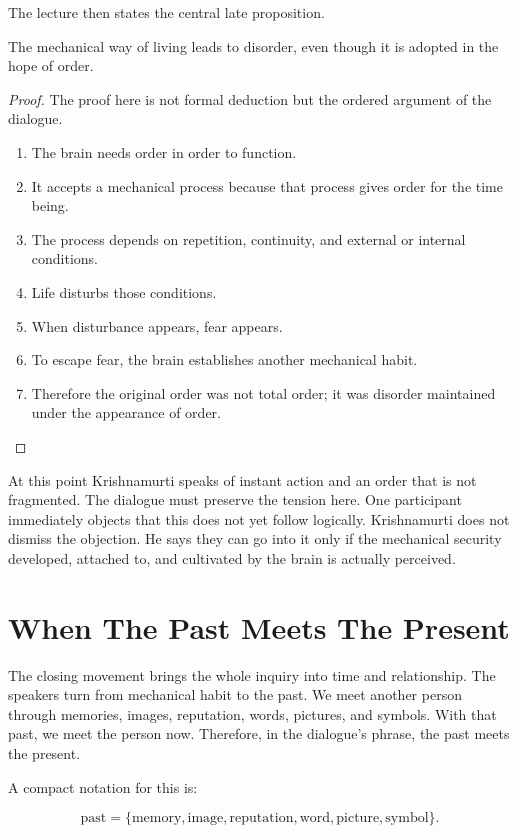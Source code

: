 The lecture then states the central late proposition.

\begin{proposition}
The mechanical way of living leads to disorder, even though it is adopted in the hope of order.
\end{proposition}

\begin{proof}
The proof here is not formal deduction but the ordered argument of the dialogue.
\begin{enumerate}
\item The brain needs order in order to function.
\item It accepts a mechanical process because that process gives order for the time being.
\item The process depends on repetition, continuity, and external or internal conditions.
\item Life disturbs those conditions.
\item When disturbance appears, fear appears.
\item To escape fear, the brain establishes another mechanical habit.
\item Therefore the original order was not total order; it was disorder maintained under the appearance of order.
\end{enumerate}
\end{proof}

At this point Krishnamurti speaks of instant action and an order that is not fragmented. The dialogue must preserve the tension here. One participant immediately objects that this does not yet follow logically. Krishnamurti does not dismiss the objection. He says they can go into it only if the mechanical security developed, attached to, and cultivated by the brain is actually perceived.

\section{When The Past Meets The Present}

The closing movement brings the whole inquiry into time and relationship. The speakers turn from mechanical habit to the past. We meet another person through memories, images, reputation, words, pictures, and symbols. With that past, we meet the person now. Therefore, in the dialogue's phrase, the past meets the present.

A compact notation for this is:

\begin{equation}
\text{past}
=
\{\text{memory},\text{image},\text{reputation},\text{word},\text{picture},\text{symbol}\}.
\end{equation}

